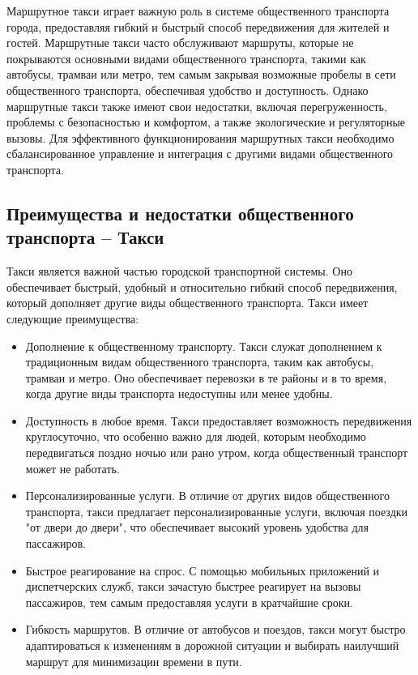 Маршрутное такси играет важную роль в системе общественного транспорта города, предоставляя гибкий и быстрый способ передвижения для жителей и гостей. Маршрутные такси часто обслуживают маршруты, которые не покрываются основными видами общественного транспорта, такими как автобусы, трамваи или метро, тем самым закрывая возможные пробелы в сети общественного транспорта, обеспечивая удобство и доступность. Однако маршрутные такси также имеют свои недостатки, включая перегруженность, проблемы с безопасностью и комфортом, а также экологические и регуляторные вызовы. Для эффективного функционирования маршрутных такси необходимо сбалансированное управление и интеграция с другими видами общественного транспорта.

\subsection{Преимущества и недостатки общественного транспорта -- Такси}

Такси является важной частью городской транспортной системы. Оно обеспечивает быстрый, удобный и относительно гибкий способ передвижения, который дополняет другие виды общественного транспорта. Такси имеет следующие преимущества:
\begin{itemize}
	\item Дополнение к общественному транспорту. Такси служат дополнением к традиционным видам общественного транспорта, таким как автобусы, трамваи и метро. Оно обеспечивает перевозки в те районы и в то время, когда другие виды транспорта недоступны или менее удобны.
	\item Доступность в любое время. Такси предоставляет возможность передвижения круглосуточно, что особенно важно для людей, которым необходимо передвигаться поздно ночью или рано утром, когда общественный транспорт может не работать.
	\item Персонализированные услуги. В отличие от других видов общественного транспорта, такси предлагает персонализированные услуги, включая поездки "от двери до двери", что обеспечивает высокий уровень удобства для пассажиров.
	\item Быстрое реагирование на спрос. С помощью мобильных приложений и диспетчерских служб, такси зачастую быстрее реагирует на вызовы пассажиров, тем самым предоставляя услуги в кратчайшие сроки.
	\item Гибкость маршрутов. В отличие от автобусов и поездов, такси могут быстро адаптироваться к изменениям в дорожной ситуации и выбирать наилучший маршрут для минимизации времени в пути.
\end{itemize}

